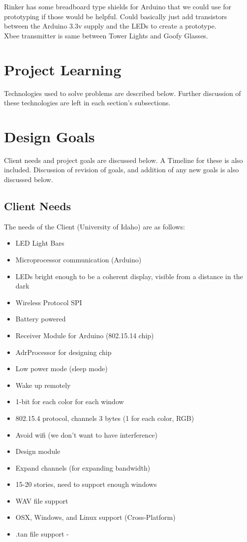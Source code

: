 \documentclass[12pt]{article}
\begin{document}
	\noindent
	Rinker has some breadboard type shields for Arduino that we could use for prototyping if those would be 	helpful. Could basically just add transistors between the Arduino 3.3v supply and the LEDs to create a 		prototype.\\
	 
	\noindent	
	Xbee transmitter is same between Tower Lights and Goofy Glasses.\\ 	

	\clearpage

\section{Project Learning}
	Technologies used to solve problems are described below. Further discussion of these technologies are left in each section's subsections.

	\newpage
  
\section{Design Goals}
	Client needs and project goals are discussed below. A Timeline for these is also included. Discussion of revision of goals, and addition of any new goals is also discussed below.
	
	\subsection{Client Needs}
	The needs of the Client (University of Idaho) are as follows:
		
		\begin{itemize}
			\item LED Light Bars
			\item Microprocessor communication (Arduino)
			\item LEDs bright enough to be a coherent display, visible from a distance in the dark
			\item Wireless Protocol SPI
			\item Battery powered
			\item Receiver Module for Arduino (802.15.14 chip) 
			\item AdrProcessor for designing chip
			\item Low power mode (sleep mode)
			\item Wake up remotely
			\item 1-bit for each color for each window
			\item 802.15.4 protocol, channels 3 bytes (1 for each color, RGB)
			\item Avoid wifi (we don't want to have interference)
			\item Design module
			\item Expand channels (for expanding bandwidth)
			\item 15-20 stories, need to support enough windows
			\item WAV file support
			\item OSX, Windows, and Linux support (Cross-Platform)
			\item .tan file support - 
		\end{itemize}
	
\end{document}
